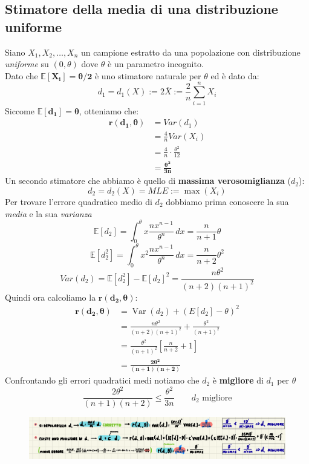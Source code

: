 \documentclass[]{article}
\newcommand{\ev}{\mathbb{E}[X]}
\renewcommand{\ev}[1]{\mathbb{E}\left[#1\right]}
\begin{document}
    \subsection{Stimatore della media di una distribuzione uniforme}
    Siano $X_1, X_2, \ldots, X_n$ un campione estratto da una popolazione con distribuzione \textit{uniforme} su $(0, \theta)$ dove $\theta$ è un parametro incognito. \\
    Dato che $\boldsymbol{\ev{X_i} = \theta /2}$ è uno stimatore naturale per $\theta$ ed è dato da:
    \[ d_1 = d_1 (X) := 2 \overline{X} := \frac{2}{n} \displaystyle\sum_{i=1}^{n} X_i \]
    Siccome $\boldsymbol{\ev{d_1} = \theta}$, otteniamo che:
    \begin{equation*}
        \begin{split}
            \boldsymbol{r(d_1, \theta)} &= Var(d_1) \\
            &= \frac{4}{n} Var(X_i) \\
            &= \frac{4}{n} \cdot \frac{\theta^2}{12} \\
            &= \boldsymbol{\frac{\theta^2}{3n}}
        \end{split}
    \end{equation*}
    Un secondo stimatore che abbiamo è quello di \textbf{massima verosomiglianza} ($d_2$):
    \[ d_2 = d_2(X) = MLE := \max(X_i) \]
    Per trovare l'errore quadratico medio di $d_2$ dobbiamo prima conoscere la sua \textit{media} e la sua \textit{varianza}
    \[ \ev{d_2} = \int_{0}^{\theta} x \frac{nx^{n-1}}{\theta^n} \, dx = \frac{n}{n + 1} \theta \]
    \[ \ev{d^2_2} = \int_{0}^{\theta} x^2 \frac{nx^{n-1}}{\theta^n} \, dx = \frac{n}{n+2} \theta^2 \]
    \[ Var(d_2) = \ev{d^2_2} - \ev{d_2}^2 = \frac{n \theta^2}{(n+2) (n+1)^2} \]
    Quindi ora calcoliamo la $\boldsymbol{r(d_2, \theta)}$:
    \begin{equation}
        \begin{aligned}
        \boldsymbol{r\left(d_2, \theta\right)} & =\operatorname{Var}\left(d_2\right)+\left(E\left[d_2\right]-\theta\right)^2 \\
        & =\frac{n \theta^2}{(n+2)(n+1)^2}+\frac{\theta^2}{(n+1)^2} \\
        & =\frac{\theta^2}{(n+1)^2}\left[\frac{n}{n+2}+1\right] \\
        & = \boldsymbol{\frac{2 \theta^2}{(n+1)(n+2)}}
        \end{aligned}
    \end{equation}
    Confrontando gli errori quadratici medi notiamo che $d_2$ è \textbf{migliore} di $d_1$ per $\theta$
    \[ \frac{2 \theta^2}{(n+1)(n+2)} \leq \frac{\theta^2}{3n} \qquad \text{$d_2$ migliore} \]
    \begin{figure}[H]
        \includegraphics[width=\textwidth]{images/boh_5.png}
    \end{figure}
    \newpage
\end{document}

